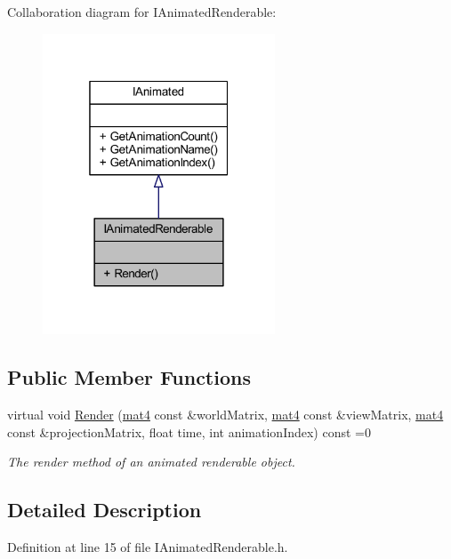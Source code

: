 Collaboration diagram for I\+Animated\+Renderable\+:
\nopagebreak
\begin{figure}[H]
\begin{center}
\leavevmode
\includegraphics[width=196pt]{class_i_animated_renderable__coll__graph}
\end{center}
\end{figure}
\subsection*{Public Member Functions}
\begin{DoxyCompactItemize}
\item 
virtual void \hyperlink{class_i_animated_renderable_ad8e9696de83337bc71dbc5d6111679e5}{Render} (\hyperlink{_types_8h_a2db59f395fe82a7394c6324956c265d8}{mat4} const \&world\+Matrix, \hyperlink{_types_8h_a2db59f395fe82a7394c6324956c265d8}{mat4} const \&view\+Matrix, \hyperlink{_types_8h_a2db59f395fe82a7394c6324956c265d8}{mat4} const \&projection\+Matrix, float time, int animation\+Index) const  =0
\begin{DoxyCompactList}\small\item\em The render method of an animated renderable object. \end{DoxyCompactList}\end{DoxyCompactItemize}


\subsection{Detailed Description}


Definition at line 15 of file I\+Animated\+Renderable.\+h.



